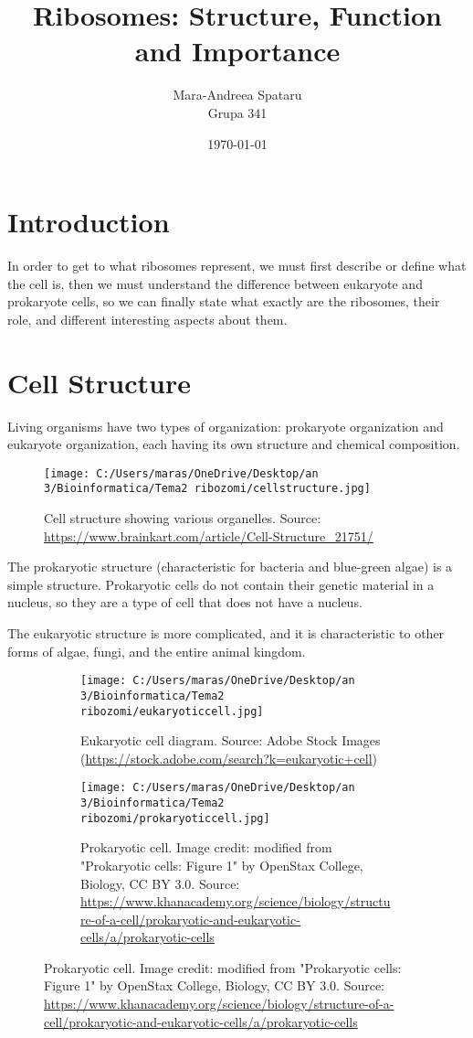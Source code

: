 \documentclass{article}
\title{Ribosomes: Structure, Function and Importance}
\author{Mara-Andreea Spataru \\ Grupa 341}
\date{\today}
\begin{document}
	
	\maketitle
	
	\section*{Introduction}
	In order to get to what ribosomes represent, we must first describe or define what the cell is, then we must understand the difference between eukaryote and prokaryote cells, so we can finally state what exactly are the ribosomes, their role, and different interesting aspects about them.
	
	\section*{Cell Structure}
	Living organisms have two types of organization: prokaryote organization and eukaryote organization, each having its own structure and chemical composition.
	
	\begin{figure}[h]
		\flushleft  %
		\texttt{[image: C:/Users/maras/OneDrive/Desktop/an 3/Bioinformatica/Tema2 ribozomi/cellstructure.jpg]}
		\caption{Cell structure showing various organelles. Source: \url{https://www.brainkart.com/article/Cell-Structure_21751/}}
	\end{figure}
	
	The prokaryotic structure (characteristic for bacteria and blue-green algae) is a simple structure. Prokaryotic cells do not contain their genetic material in a nucleus, so they are a type of cell that does not have a nucleus.
	
	The eukaryotic structure is more complicated, and it is characteristic to other forms of algae, fungi, and the entire animal kingdom.
	
	\begin{figure}[h]
		\centering  %
		\begin{subfigure}{0.42\textwidth}
			\centering
			\texttt{[image: C:/Users/maras/OneDrive/Desktop/an 3/Bioinformatica/Tema2 ribozomi/eukaryoticcell.jpg]}
			\caption{Eukaryotic cell diagram. Source: Adobe Stock Images (\url{https://stock.adobe.com/search?k=eukaryotic+cell})}
		\end{subfigure}
		\hfill  %
		\begin{subfigure}{0.42\textwidth}
			\centering
			\texttt{[image: C:/Users/maras/OneDrive/Desktop/an 3/Bioinformatica/Tema2 ribozomi/prokaryoticcell.jpg]}
			\caption{Prokaryotic cell. Image credit: modified from "Prokaryotic cells: Figure 1" by OpenStax College, Biology, CC BY 3.0. Source: \url{https://www.khanacademy.org/science/biology/structure-of-a-cell/prokaryotic-and-eukaryotic-cells/a/prokaryotic-cells}}
		\end{subfigure}
	\end{figure}
	
\end{document}
